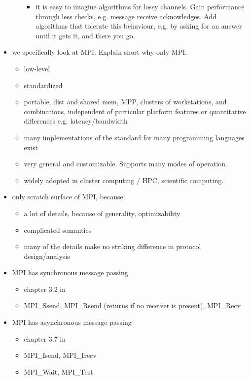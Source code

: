 \documentclass[a4paper, 10pt]{article}
\begin{document}
\begin{itemize}
\begin{itemize}
\begin{itemize}
					\item it is easy to imagine algorithms for lossy channels. Gain performance through less checks, e.g. message receive acknowledges. Add algorithms that tolerate this behaviour, e.g. by asking for an answer until it gets it, and there you go.
				\end{itemize}
		\end{itemize}
	\label{why-only-mpi}
	\item we specifically look at MPI\cite{mpi}. Explain short why only MPI.
		\begin{itemize}
			\item low-level
			\item standardized
			\item portable, dist and shared mem, MPP, clusters of workstations, and combinations, independent of particular platform features or quantitative differences e.g. latency/bandwidth
			\item many implementations of the standard for many programming languages exist
			\item very general and customizable. Supports many modes of operation.
			\item widely adopted in cluster computing / HPC, scientific computing.~\cite{mpiadoptiona}\cite{mpiadoptionb}\cite{mpiadoptionc}
		\end{itemize}
	\item only scratch surface of MPI, because:
		\begin{itemize}
			\item a lot of details, because of generality, optimizability
			\item complicated semantics
			\item many of the details make no striking difference in protocol design/analysis
		\end{itemize}
	\item MPI has synchronous message passing
		\begin{itemize}
			\item chapter 3.2 in \cite{mpi3}
			\item MPI\_Ssend, MPI\_Rsend (returns if no receiver is present), MPI\_Recv
		\end{itemize}
	\item MPI has asynchronous message passing
		\begin{itemize}
			\item chapter 3.7 in \cite{mpi3}
			\item MPI\_Isend, MPI\_Irecv
			\item MPI\_Wait, MPI\_Test

\end{itemize}
\end{itemize}
\end{document}
